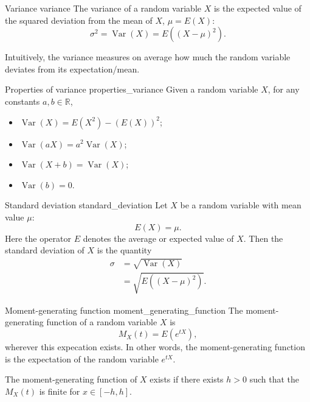 \begin{definition}{Variance \cite{wikipedia_variance}}{variance}
	The variance of a random variable $X$ is the expected value of the squared deviation from the mean of $X$, $\mu = E(X)$:
	$$ \sigma^2 = \operatorname{Var}(X) = E((X - \mu)^2) . $$
\end{definition}

Intuitively, the variance measures on average how much the random variable deviates from its expectation/mean. \cite{math2901_notes}

\begin{lemma}{Properties of variance \cite{math2901_notes}}{properties_variance}
	Given a random variable $X$, for any constants $a, b \in \mathbb{R}$,
	\begin{itemize}
		\item $ \operatorname{Var}(X) = E(X^2) - (E(X))^2 $;
		\item $ \operatorname{Var}(aX) = a^2 \operatorname{Var}(X) $;
		\item $ \operatorname{Var}(X + b) = \operatorname{Var}(X) $;
		\item $ \operatorname{Var}(b) = 0 $.
	\end{itemize}
\end{lemma}

\begin{definition}{Standard deviation \cite{wikipedia_standard_deviation}}{standard_deviation}
	Let $X$ be a random variable with mean value $\mu$:
	$$ E(X) = \mu . $$
	Here the operator $E$ denotes the average or expected value of $X$. Then the standard deviation of $X$ is the quantity
	\begin{align*}
		\sigma &= \sqrt{\operatorname{Var}(X)} \\
		&= \sqrt{E((X - \mu)^2)} .
	\end{align*}
\end{definition}

\begin{definition}{Moment-generating function \cite{wikipedia_moment_generating_function}}{moment_generating_function}
	The moment-generating function of a random variable $X$ is
	$$ M_X(t) = E(e^{tX}) , $$
	wherever this expecation exists. In other words, the moment-generating function is the expectation of the random variable $e^{tX}$.
\end{definition}

The moment-generating function of $X$ exists if there exists $h > 0$ such that the $M_X(t)$ is finite for $x \in [-h, h]$.

